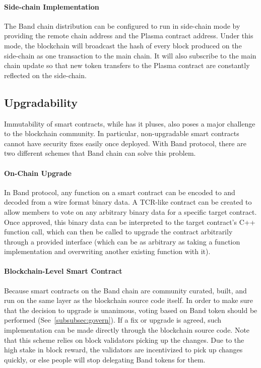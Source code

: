 \documentclass[letterpaper,11pt]{article}
\begin{document}
\paragraph{Side-chain Implementation} The Band chain distribution can be configured to run in side-chain mode by providing the remote chain address and the Plasma contract address. Under this mode, the blockchain will broadcast the hash of every block produced on the side-chain as one transaction to the main chain. It will also subscribe to the main chain update so that new token transfers to the Plasma contract are constantly reflected on the side-chain.  

\subsection{Upgradability} \label{sec:other-applications}
Immutability of smart contracts, while has it pluses, also poses a major challenge to the blockchain community. In particular, non-upgradable smart contracts cannot have security fixes easily once deployed. With Band protocol, there are two different schemes that Band chain can solve this problem.

\paragraph{On-Chain Upgrade} In Band protocol, any function on a smart contract can be encoded to and decoded from a wire format binary data. A TCR-like contract can be created to allow members to vote on any arbitrary binary data for a specific target contract. Once approved, this binary data can be interpreted to the target contract's C++ function call, which can then be called to upgrade the contract arbitrarily through a provided interface (which can be as arbitrary as taking a function implementation and overwriting another existing function with it).

\paragraph{Blockchain-Level Smart Contract}
Because smart contracts on the Band chain are community curated, built, and run on the same layer as the blockchain source code itself. In order to make sure that the decision to upgrade is unanimous, voting based on Band token should be performed (See~\cref{subsubsec:govern}). If a fix or upgrade is agreed, such implementation can be made directly through the blockchain source code. Note that this scheme relies on block validators picking up the changes. Due to the high stake in block reward, the validators are incentivized to pick up changes quickly, or else people will stop delegating Band tokens for them. 
\end{document}
